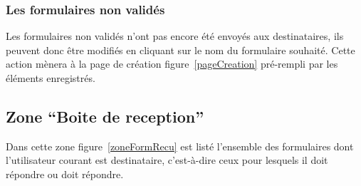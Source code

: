 \documentclass[a4paper,11pt,final]{report}
\begin{document}
\noindent\begin{minipage}{\linewidth}%
\label{urlForm}
\end{minipage}

\subsubsection{Les formulaires non validés}
Les formulaires non validés n'ont pas encore été envoyés aux destinataires, ils peuvent donc être modifiés en cliquant sur le nom du formulaire souhaité. Cette action mènera à la page de création figure~\ref{pageCreation} pré-rempli par les éléments enregistrés.

\subsection{Zone ``Boite de reception''}
Dans cette zone figure~\ref{zoneFormRecu} est listé l'ensemble des formulaires dont l'utilisateur courant est destinataire, c'est-à-dire ceux pour lesquels il doit répondre ou doit répondre.\\

\noindent\begin{minipage}{\linewidth}%
\label{zoneFormRecu}
\end{minipage}
\end{document}
